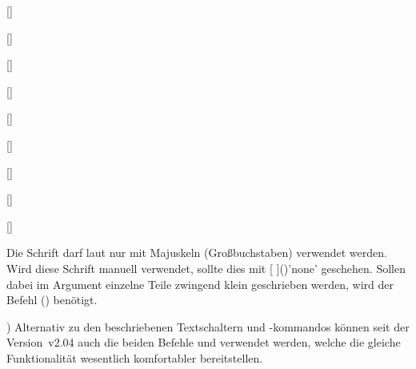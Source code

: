 \begin{Declaration*}{}
\begin{Declaration*}{}
\begin{Declaration*}{}
\begin{Declaration}{}
\begin{Declaration}{[]}
\begin{Declaration}{}
\begin{Declaration}{[]}
\begin{Declaration}{}
\begin{Declaration}{[]}
\begin{Declaration}{}
\begin{Declaration}{[]}
\begin{Declaration}{}
\begin{Declaration}{[]}
\begin{Declaration}{}
\begin{Declaration}{[]}
\begin{Declaration}{}
\begin{Declaration}{[]}
\begin{Declaration}{}
\begin{Declaration}{[]}
\begin{Declaration}{}
\begin{Declaration}{[]}
\begin{minipage}{-\tempdim}
\begin{tabularm}{3}
{      Die Schrift \DIN darf laut \CD nur mit Majuskeln (Großbuchstaben) 
      verwendet werden. Wird diese Schrift manuell verwendet, sollte dies mit 
      [%
      ]()'none' geschehen. Sollen dabei im Argument einzelne 
      Teile zwingend klein geschrieben werden, wird der Befehl 
      () benötigt.
    }
  \end{tabularm}%
  \end{minipage}%
)%
Alternativ zu den beschriebenen Textschaltern und -kommandos können seit der 
Version~v2.04 auch die beiden Befehle  und  
verwendet werden, welche die gleiche Funktionalität wesentlich komfortabler 
bereitstellen.
\end{Declaration}
\end{Declaration}
\end{Declaration}
\end{Declaration}
\end{Declaration}
\end{Declaration}
\end{Declaration}
\end{Declaration}
\end{Declaration}
\end{Declaration}
\end{Declaration}
\end{Declaration}
\end{Declaration}
\end{Declaration}
\end{Declaration}
\end{Declaration}
\end{Declaration}
\end{Declaration}




\end{Declaration*}
\end{Declaration*}
\end{Declaration*}
